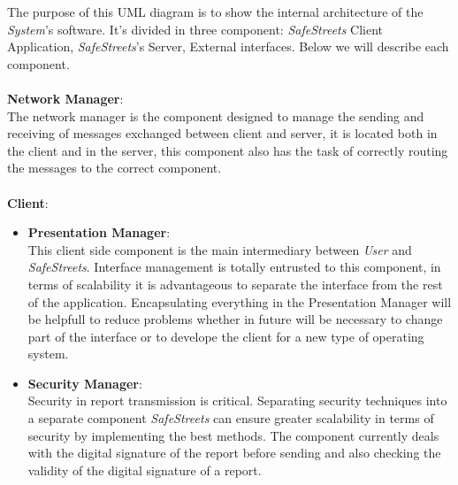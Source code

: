 \documentclass{article}
\begin{document}
The purpose of this UML diagram is to show the internal architecture of the \textit{System}'s software. It's divided in 
three component: \textit{SafeStreets} Client Application, \textit{SafeStreets}'s Server, External interfaces.
Below we will describe each component.
\\
\\
\textbf{Network Manager}: \\
The network manager is the component designed to manage the sending and receiving of 
messages exchanged between client and server, it is located both in the client and in the 
server, this component also has the task of correctly routing the messages to the correct 
component.
\\
\\
\textbf{Client}:

\begin{itemize}

\item \textbf{Presentation Manager}:\\
This client side component is the main intermediary between \textit{User} and \textit{SafeStreets}. 
Interface management is totally entrusted to this component, in terms of scalability it 
is advantageous to separate the interface from the rest of the application. Encapsulating 
everything in the Presentation Manager will be helpfull to reduce problems whether in future 
will be necessary to change part of the interface or to develope the client for a new type of 
operating system.

\item \textbf{Security Manager}:\\
Security in report transmission is critical. Separating security techniques into a 
separate component \textit{SafeStreets} can ensure greater scalability in terms of security 
by implementing the best methods. The component currently deals with the digital signature 
of the report before sending and also checking the validity of the digital signature of a 
report.


\end{itemize}
\end{document}
